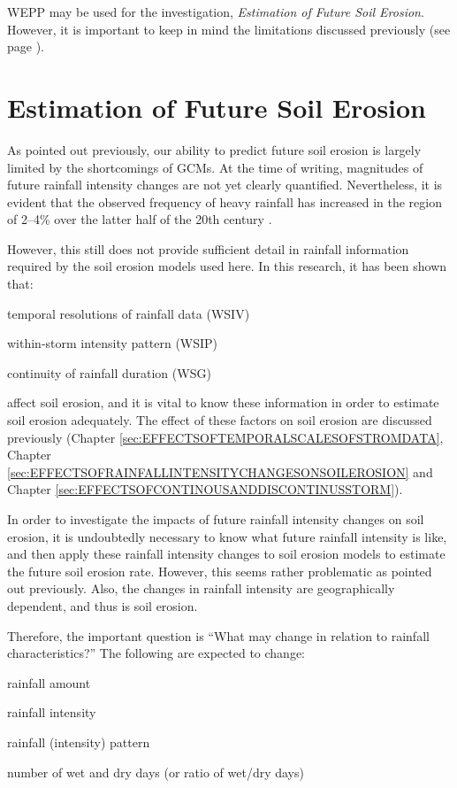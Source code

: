 WEPP may be used for the investigation, \textit{Estimation of Future Soil
Erosion}. However, it is important to keep in mind the limitations discussed
previously (see page \pageref{sec:WEPPModificationofBP}).


\section{Estimation of Future Soil Erosion}
\label{sec:MethodsEstimatedFutureSoilErosion}

As pointed out previously, our ability to predict future soil erosion is largely
limited by the shortcomings of GCMs. At the time of writing, magnitudes of
future rainfall intensity changes are not yet clearly quantified. Nevertheless,
it is evident that the observed frequency of heavy rainfall has increased in the
region of 2--4\% over the latter half of the 20th century
\citep{ipcc2001-881}.

However, this still does not provide sufficient detail in rainfall information
required by the soil erosion models used here. In this research, it has been
shown that:
\begin{itemize*}
\item temporal resolutions of rainfall data (WSIV)
\item within-storm intensity pattern (WSIP)
\item continuity of rainfall duration (WSG)
\end{itemize*}
affect soil erosion, and it is vital to know these information in order to
estimate soil erosion adequately. The effect of these factors on soil erosion
are discussed previously (Chapter \ref{sec:EFFECTSOFTEMPORALSCALESOFSTROMDATA},
Chapter \ref{sec:EFFECTSOFRAINFALLINTENSITYCHANGESONSOILEROSION} and Chapter
\ref{sec:EFFECTSOFCONTINOUSANDDISCONTINUSSTORM}).

In order to investigate the impacts of future rainfall intensity changes on soil
erosion, it is undoubtedly necessary to know what future rainfall intensity is
like, and then apply these rainfall intensity changes to soil erosion models to
estimate the future soil erosion rate. However, this seems rather problematic as
pointed out previously. Also, the changes in rainfall intensity are
geographically dependent, and thus is soil erosion.

Therefore, the important question is ``What may change in relation to rainfall
characteristics?'' The following are expected to change:
\begin{itemize*}
  \item rainfall amount
  \item rainfall intensity
  \item rainfall (intensity) pattern
  \item number of wet and dry days (or ratio of wet/dry days)
\end{itemize*}

